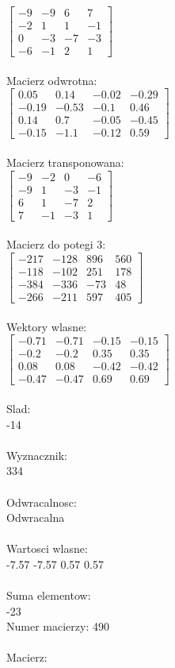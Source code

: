 \documentclass[a4paper,12pt]{article}
\begin{document}
$\begin{bmatrix} -9&-9&6&7\\-2&1&1&-1\\0&-3&-7&-3\\-6&-1&2&1 \end{bmatrix}$
\\
\\
Macierz odwrotna:\\

$\begin{bmatrix} 0.05&0.14&-0.02&-0.29\\-0.19&-0.53&-0.1&0.46\\0.14&0.7&-0.05&-0.45\\-0.15&-1.1&-0.12&0.59 \end{bmatrix}$
\\
\\
Macierz transponowana:\\

$\begin{bmatrix} -9&-2&0&-6\\-9&1&-3&-1\\6&1&-7&2\\7&-1&-3&1 \end{bmatrix}$
\\
\\
Macierz do potegi 3:\\

$\begin{bmatrix} -217&-128&896&560\\-118&-102&251&178\\-384&-336&-73&48\\-266&-211&597&405 \end{bmatrix}$
\\
\\
Wektory wlasne:\\

$\begin{bmatrix} -0.71&-0.71&-0.15&-0.15\\-0.2&-0.2&0.35&0.35\\0.08&0.08&-0.42&-0.42\\-0.47&-0.47&0.69&0.69 \end{bmatrix}$
\\
\\
Slad:\\
-14
\\
\\
Wyznacznik:\\
334
\\
\\
Odwracalnosc:\\
Odwracalna
\\
\\
Wartosci wlasne:\\
-7.57 -7.57 0.57 0.57
\\
\\
Suma elementow:\\
-23
\\
\newpage
Numer macierzy:
490
\\
\\
Macierz:\\
\end{document}
